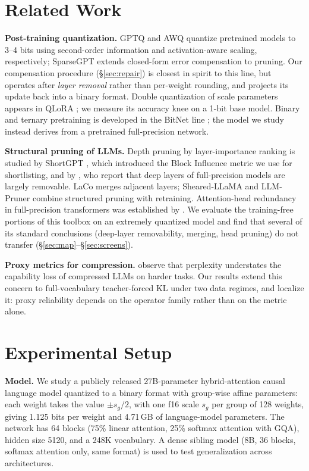 \documentclass[10pt]{article}
\begin{document}
\section{Related Work}
\textbf{Post-training quantization.} GPTQ \citep{gptq} and AWQ \citep{awq} quantize pretrained models to 3--4 bits using second-order information and activation-aware scaling, respectively; SparseGPT \citep{sparsegpt} extends closed-form error compensation to pruning. Our compensation procedure (\S\ref{sec:repair}) is closest in spirit to this line, but operates after \emph{layer removal} rather than per-weight rounding, and projects its update back into a binary format. Double quantization of scale parameters appears in QLoRA \citep{qlora}; we measure its accuracy knee on a 1-bit base model. Binary and ternary pretraining is developed in the BitNet line \citep{bitnet,bitnet158}; the model we study instead derives from a pretrained full-precision network.

\textbf{Structural pruning of LLMs.} Depth pruning by layer-importance ranking is studied by ShortGPT \citep{shortgpt}, which introduced the Block Influence metric we use for shortlisting, and by \citet{gromov}, who report that deep layers of full-precision models are largely removable. LaCo \citep{laco} merges adjacent layers; Sheared-LLaMA \citep{sheared} and LLM-Pruner \citep{llmpruner} combine structured pruning with retraining. Attention-head redundancy in full-precision transformers was established by \citet{sixteenheads}. We evaluate the training-free portions of this toolbox on an extremely quantized model and find that several of its standard conclusions (deep-layer removability, merging, head pruning) do not transfer (\S\ref{sec:map}--\S\ref{sec:screens}).

\textbf{Proxy metrics for compression.} \citet{jaiswal} observe that perplexity understates the capability loss of compressed LLMs on harder tasks. Our results extend this concern to full-vocabulary teacher-forced KL under two data regimes, and localize it: proxy reliability depends on the operator family rather than on the metric alone.

\section{Experimental Setup}
\label{sec:setup}
\textbf{Model.} We study a publicly released 27B-parameter hybrid-attention causal language model quantized to a binary format with group-wise affine parameters: each weight takes the value $\pm s_g/2$, with one f16 scale $s_g$ per group of 128 weights, giving 1.125 bits per weight and 4.71\,GB of language-model parameters. The network has 64 blocks (75\% linear attention, 25\% softmax attention with GQA), hidden size 5120, and a 248K vocabulary. A dense sibling model (8B, 36 blocks, softmax attention only, same format) is used to test generalization across architectures.
\end{document}
